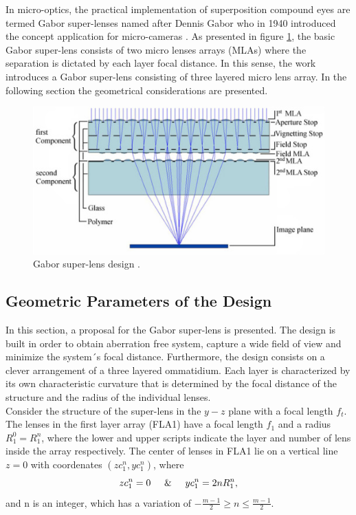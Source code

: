 In micro-optics, the practical implementation of superposition compound eyes are termed Gabor super-lenses \cite{stollberg2009gabor} named after Dennis Gabor who in 1940 introduced the concept application for micro-cameras \cite{DGaborSL}. As presented in figure \ref{fig:Gabor design}, the basic Gabor super-lens consists of two micro lenses arrays (MLAs) where the separation is dictated by each layer focal distance. In this sense, the work introduces a Gabor super-lens consisting of three layered micro lens array. In the following section the geometrical considerations are presented.\\ 

\begin{figure}[H]
    \centering
    \includegraphics[width=\columnwidth]{Figures/Gabor-Superlens.jpeg}
    \caption{Gabor super-lens design \cite{stollberg2009gabor} .}
    \label{fig:Gabor design}
\end{figure}

\subsection{Geometric Parameters of the Design}
In this section, a proposal for the Gabor super-lens is presented. The design is built in order to obtain aberration free system, capture a wide field of view and minimize the system´s focal distance. Furthermore, the design consists on a clever arrangement of a three layered ommatidium. Each layer is characterized by its own characteristic curvature that is determined by the focal distance of the structure and the radius of the individual lenses.\\

Consider the structure of the super-lens in the $y-z$ plane with a focal length $f_t$. The lenses in the first layer array (FLA1) have a focal length $f_1$ and a radius $R_1^0 = R_1^n$, where the lower and upper scripts indicate the layer and number of lens inside the array respectively. The center of lenses in FLA1 lie on a vertical line $z=0$ with coordenates $(zc_1^n,yc_1^n)$, where
\begin{equation}
    zc_1^n = 0 \hspace{0.5cm}\&\hspace{0.5cm} yc_1^n = 2nR_1^n ,
\end{equation}
and n is an integer, which has a variation of $-\frac{m-1}{2}\ge n \le \frac{m-1}{2}$. \\

